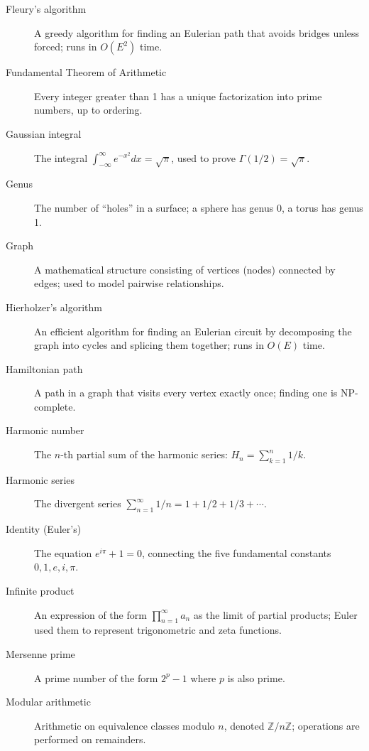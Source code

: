 \begin{description}
\item[Fleury's algorithm] A greedy algorithm for finding an Eulerian path that avoids bridges unless forced; runs in $O(E^2)$ time.

\item[Fundamental Theorem of Arithmetic] Every integer greater than 1 has a unique factorization into prime numbers, up to ordering.

\item[Gaussian integral] The integral $\int_{-\infty}^{\infty} e^{-x^2} dx = \sqrt{\pi}$, used to prove $\Gamma(1/2) = \sqrt{\pi}$.

\item[Genus] The number of ``holes'' in a surface; a sphere has genus 0, a torus has genus 1.

\item[Graph] A mathematical structure consisting of vertices (nodes) connected by edges; used to model pairwise relationships.

\item[Hierholzer's algorithm] An efficient algorithm for finding an Eulerian circuit by decomposing the graph into cycles and splicing them together; runs in $O(E)$ time.

\item[Hamiltonian path] A path in a graph that visits every vertex exactly once; finding one is NP-complete.

\item[Harmonic number] The $n$-th partial sum of the harmonic series: $H_n = \sum_{k=1}^n 1/k$.

\item[Harmonic series] The divergent series $\sum_{n=1}^{\infty} 1/n = 1 + 1/2 + 1/3 + \cdots$.

\item[Identity (Euler's)] The equation $e^{i\pi} + 1 = 0$, connecting the five fundamental constants $0, 1, e, i, \pi$.

\item[Infinite product] An expression of the form $\prod_{n=1}^{\infty} a_n$ as the limit of partial products; Euler used them to represent trigonometric and zeta functions.

\item[Mersenne prime] A prime number of the form $2^p - 1$ where $p$ is also prime.

\item[Modular arithmetic] Arithmetic on equivalence classes modulo $n$, denoted $\mathbb{Z}/n\mathbb{Z}$; operations are performed on remainders.


\end{description}
